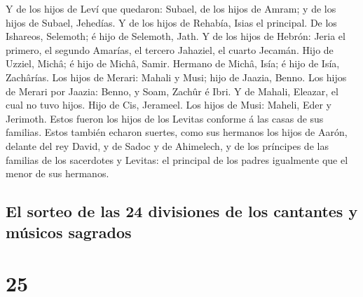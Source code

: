  Y de los hijos de Leví que quedaron: Subael, de los
hijos de Amram; y de los hijos de Subael, Jehedías.  Y de
los hijos de Rehabía, Isias el principal.  De los
Ishareos, Selemoth; é hijo de Selemoth, Jath.  Y de los
hijos de Hebrón: Jeria el primero, el segundo Amarías, el tercero
Jahaziel, el cuarto Jecamán.  Hijo de Uzziel, Michâ; é
hijo de Michâ, Samir.  Hermano de Michâ, Isía; é hijo de
Isía, Zachârías.  Los hijos de Merari: Mahali y Musi;
hijo de Jaazia, Benno.  Los hijos de Merari por Jaazia:
Benno, y Soam, Zachûr é Ibri.  Y de Mahali, Eleazar, el
cual no tuvo hijos.  Hijo de Cis, Jerameel.
 Los hijos de Musi: Maheli, Eder y Jerimoth. Estos fueron
los hijos de los Levitas conforme á las casas de sus familias.
 Estos también echaron suertes, como sus hermanos los
hijos de Aarón, delante del rey David, y de Sadoc y de Ahimelech, y de
los príncipes de las familias de los sacerdotes y Levitas: el principal
de los padres igualmente que el menor de sus hermanos.

\hypertarget{el-sorteo-de-las-24-divisiones-de-los-cantantes-y-muxfasicos-sagrados}{%
\subsection{El sorteo de las 24 divisiones de los cantantes y músicos
sagrados}\label{el-sorteo-de-las-24-divisiones-de-los-cantantes-y-muxfasicos-sagrados}}

\hypertarget{section-24}{%
\section{25}\label{section-24}}

